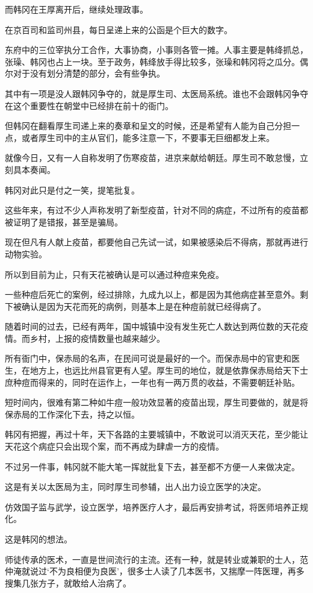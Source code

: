 而韩冈在王厚离开后，继续处理政事。

在京百司和监司州县，每日呈递上来的公函是个巨大的数字。

东府中的三位宰执分工合作，大事协商，小事则各管一摊。人事主要是韩绛抓总，张璪、韩冈也占上一块。至于政务，韩绛放手得比较多，张璪和韩冈将之瓜分。偶尔对于没有划分清楚的部分，会有些争执。

其中有一项是没人跟韩冈争夺的，就是厚生司、太医局系统。谁也不会跟韩冈争夺在这个重要性在朝堂中已经排在前十的衙门。

但韩冈在翻看厚生司递上来的奏章和呈文的时候，还是希望有人能为自己分担一点，或者厚生司中的主从官们，能多注意一下，不要事无巨细都发上来。

就像今日，又有一人自称发明了伤寒疫苗，进京来献给朝廷。厚生司不敢怠慢，立刻具本奏闻。

韩冈对此只是付之一笑，提笔批复。

这些年来，有过不少人声称发明了新型疫苗，针对不同的病症，不过所有的疫苗都被证明了是错报，甚至是骗局。

现在但凡有人献上疫苗，都要他自己先试一试，如果被感染后不得病，那就再进行动物实验。

所以到目前为止，只有天花被确认是可以通过种痘来免疫。

一些种痘后死亡的案例，经过排除，九成九以上，都是因为其他病症甚至意外。剩下被确认是因为天花而死的病例，则基本上是在种痘前就已经得病了。

随着时间的过去，已经有两年，国中城镇中没有发生死亡人数达到两位数的天花疫情。而乡村，上报的疫情数量也越来越少。

所有衙门中，保赤局的名声，在民间可说是最好的一个。而保赤局中的官吏和医生，在地方上，也远比州县官更有人望。厚生司的地位，就是依靠保赤局给天下士庶种痘而得来的，同时在运作上，一年也有一两万贯的收益，不需要朝廷补贴。

短时间内，很难有第二种如牛痘一般功效显著的疫苗出现，厚生司要做的，就是将保赤局的工作深化下去，持之以恒。

韩冈有把握，再过十年，天下各路的主要城镇中，不敢说可以消灭天花，至少能让天花这个病症只会出现个案，而不再成为肆虐一方的疫情。

不过另一件事，韩冈就不能大笔一挥就批复下去，甚至都不方便一人来做决定。

这是有关以太医局为主，同时厚生司参辅，出人出力设立医学的决定。

仿效国子监与武学，设立医学，培养医疗人才，最后再安排考试，将医师培养正规化。

这是韩冈的想法。

师徒传承的医术，一直是世间流行的主流。还有一种，就是转业或兼职的士人，范仲淹就说过‘不为良相便为良医’，很多士人读了几本医书，又揣摩一阵医理，再多搜集几张方子，就敢给人治病了。

